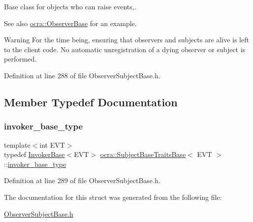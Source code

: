 Base class for objects who can raise events,. 

\begin{DoxySeeAlso}{See also}
\hyperlink{classocra_1_1ObserverBase}{ocra\+::\+Observer\+Base} for an example.
\end{DoxySeeAlso}
\begin{DoxyWarning}{Warning}
For the time being, ensuring that observers and subjects are alive is left to the client code. No automatic unregistration of a dying observer or subject is performed. 
\end{DoxyWarning}


Definition at line 288 of file Observer\+Subject\+Base.\+h.



\subsection{Member Typedef Documentation}
\hypertarget{structocra_1_1SubjectBaseTraitsBase_a439671662c8f8f3e80e6675f008dec3f}{}\label{structocra_1_1SubjectBaseTraitsBase_a439671662c8f8f3e80e6675f008dec3f} 
\subsubsection{\texorpdfstring{invoker\+\_\+base\+\_\+type}{invoker\_base\_type}}
{\footnotesize\ttfamily template$<$int E\+VT$>$ \\
typedef \hyperlink{classocra_1_1InvokerBase}{Invoker\+Base}$<$E\+VT$>$ \hyperlink{structocra_1_1SubjectBaseTraitsBase}{ocra\+::\+Subject\+Base\+Traits\+Base}$<$ E\+VT $>$\+::\hyperlink{structocra_1_1SubjectBaseTraitsBase_a439671662c8f8f3e80e6675f008dec3f}{invoker\+\_\+base\+\_\+type}}



Definition at line 289 of file Observer\+Subject\+Base.\+h.



The documentation for this struct was generated from the following file\+:\begin{DoxyCompactItemize}
\item 
\hyperlink{ObserverSubjectBase_8h}{Observer\+Subject\+Base.\+h}\end{DoxyCompactItemize}

